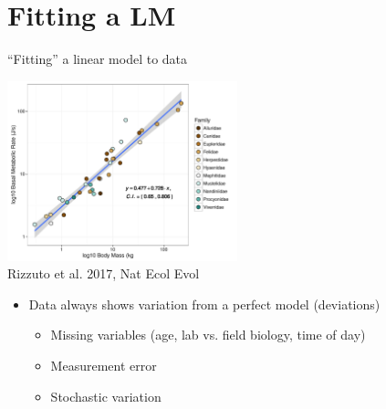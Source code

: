 \documentclass[xcolor=x11names,compress]{beamer}
\renewcommand{\(}{\begin{columns}}
\renewcommand{\)}{\end{columns}}
\newcommand{\<}[1]{\begin{column}{#1}}
\renewcommand{\>}{\end{column}}
\begin{document}
\section{Fitting a LM}


\begin{frame}{``Fitting'' a linear model to data}


 \begin{center}
            \includegraphics[width=0.5\textwidth]{CarnivoreBMRplot.pdf}\\
            \vspace{-6pt}
            {\tiny Rizzuto et al. 2017, Nat Ecol Evol}
\end{center}		
\begin{itemize}\itemsep6pt
    \item Data always shows variation from a perfect model (deviations)
    \begin{itemize}[<+->]
    \item Missing variables (age, lab vs. field biology, time of day) 
    \item Measurement error 
    \item Stochastic variation
    \end{itemize}
    \end{itemize}

\end{frame}
    
\end{document}
